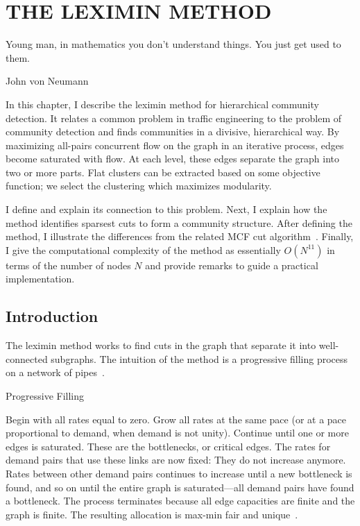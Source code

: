 \chapter{THE LEXIMIN METHOD} \label{ch:algorithm}%

\epigraph{Young man, in mathematics you don't understand things. You just get used to them.}{John von Neumann}

\noindent In this chapter, I describe the leximin method for hierarchical community detection. It relates a common problem in traffic engineering to the problem of community detection and finds communities in a divisive, hierarchical way. By maximizing all-pairs concurrent flow on the graph in an iterative process, edges become saturated with flow. At each level, these edges separate the graph into two or more parts. Flat clusters can be extracted based on some objective function; we select the clustering which maximizes modularity.

I define  and explain its connection to this problem. Next, I explain how the method identifies sparsest cuts to form a community structure. After defining the method, I illustrate the differences from the related MCF cut algorithm~\cite{mann2008extensions}. Finally, I give the computational complexity of the method as essentially $O(N^{11})$ in terms of the number of nodes $N$ and provide remarks to guide a practical implementation.



\section{Introduction}

The leximin method works to find cuts in the graph that separate it into well-connected subgraphs. The intuition of the method is a progressive filling process on a network of pipes~\cite{le2005rate}. 

\begin{method}{Progressive Filling~\cite{le2005rate}}

Begin with all rates equal to zero. Grow all rates at the same pace (or at a pace proportional to demand, when demand is not unity). Continue until one or more edges is saturated. These are the bottlenecks, or critical edges. The rates for demand pairs that use these links are now fixed: They do not increase anymore. Rates between other demand pairs continues to increase until a new bottleneck is found, and so on until the entire graph is saturated---all demand pairs have found a bottleneck. The process terminates because all edge capacities are finite and the graph is finite. The resulting allocation is max-min fair and unique~\cite{le2005rate}.
\end{method}

